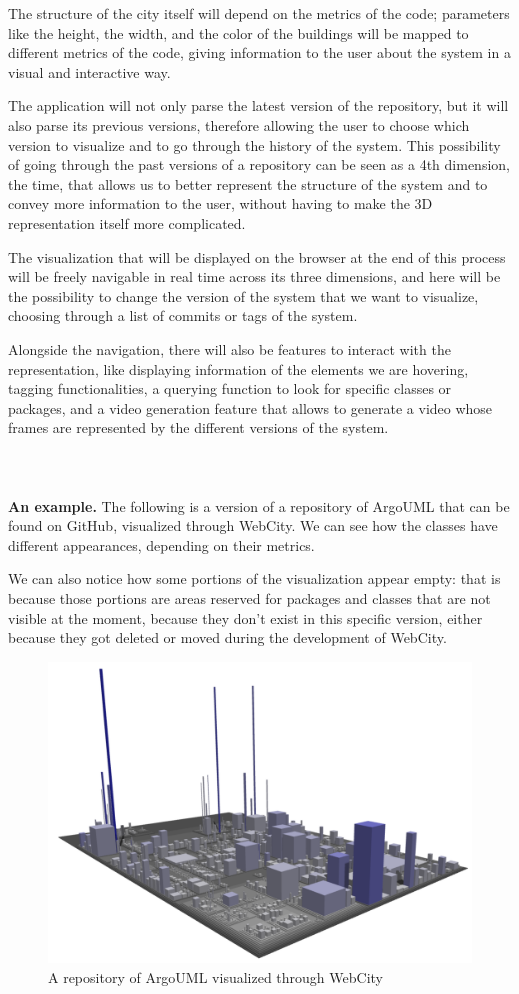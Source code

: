 \documentclass[]{usiinfbachelorproject}
\begin{document}
The structure of the city itself will depend on the metrics of the code; parameters like the height, the width, and the color of the buildings will be mapped to different metrics of the code, giving information to the user about the system in a visual and interactive way.

The application will not only parse the latest version of the repository, but it will also parse its previous versions, therefore allowing the user to choose which version to visualize and to go through the history of the system. This possibility of going through the past versions of a repository can be seen as a 4th dimension, the time, that allows us to better represent the structure of the system and to convey more information to the user, without having to make the 3D representation itself more complicated.

The visualization that will be displayed on the browser at the end of this process will be freely navigable in real time across its three dimensions, and here will be the possibility to change the version of the system that we want to visualize, choosing through a list of commits or tags of the system.

Alongside the navigation, there will also be features to interact with the representation, like displaying information of the elements we are hovering, tagging functionalities, a querying function to look for specific classes or packages, and a video generation feature that allows to generate a video whose frames are represented by the different versions of the system.\\\\\\\\

\textbf{An example.} The following is a version of a repository of ArgoUML that can be found on GitHub, visualized through WebCity. We can see how the classes have different appearances, depending on their metrics.

We can also notice how some portions of the visualization appear empty: that is because those portions are areas reserved for packages and classes that are not visible at the moment, because they don't exist in this specific version, either because they got deleted or moved during the development of WebCity.
\begin{figure} [H]
\centering
\includegraphics[width=.8\textwidth]{pictures/example.png}
\caption{A repository of ArgoUML visualized through WebCity}
\label{fig:example}
\end{figure}
\end{document}

